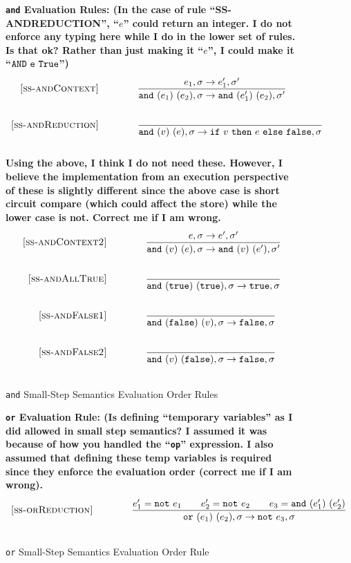 \documentclass{article}
\newcommand{\ife}[3]{\mbox{\tt if}~{#1}~\mbox{\tt then}~{#2}~\mbox{\tt else}~{#3}}
\newcommand{\note}[1]{\mbox{\tt not}~#1}
\newcommand{\ande}[2]{\mbox{\tt and}~(#1)~(#2)}
\newcommand{\ore}[2]{\mbox{\tt or}~(#1)~(#2)}
\newcommand{\true}{\mbox{\tt true}}
\newcommand{\false}{\mbox{\tt false}}
\begin{document}
\begin{figure}[H]\label{fig:andRules}
\caption{{\tt and} Small-Step Semantics Evaluation Order Rules}
{\bf {\tt and} Evaluation Rules: (In the case of rule ``SS-ANDREDUCTION'', ``$e$'' could return an integer.  I do not enforce any typing here while I do in the lower set of rules.  Is that ok?  Rather than just making it ``$e$'', I could make it ``${\tt AND~e~True}$'')}
\[
\\
\begin{array}{r@{\qquad\qquad}l}
\ssrule{ss-andContext}{
  \sstep{e_1}{\sigma}{e_1'}{\sigma'}
}{
  \sstep{\ande{e_1}{e_2}}{\sigma}{\ande{e_1'}{e_2}}{\sigma'}
}
\ssrule{ss-andReduction}{
}{
  \sstep{\ande{v}{e}}{\sigma}{\ife{v}{e}{\false}}{\sigma}
}
\end{array}
\]
{\bf Using the above, I think I do not need these.  However, I believe the implementation
from an execution perspective of these is slightly different since the above case is short circuit compare (which could affect the store) while the lower case is not.  Correct me if I am wrong.} 
\[
\\
\begin{array}{r@{\qquad\qquad}l}
\ssrule{ss-andContext2}{
  \sstep{e}{\sigma}{e'}{\sigma'}
}{
  \sstep{\ande{v}{e}}{\sigma}{\ande{v}{e'}}{\sigma'}
}
\ssrule{ss-andAllTrue}{
}{
  \sstep{\ande{\true}{\true}}{\sigma}{\true}{\sigma}
}
\ssrule{ss-andFalse1}{
}{
  \sstep{\ande{\false}{v}}{\sigma}{\false}{\sigma}
}
\ssrule{ss-andFalse2}{
}{
  \sstep{\ande{v}{\false}}{\sigma}{\false}{\sigma}
}
\end{array}
\]
\end{figure}

\begin{figure}[H]\label{fig:orRules}
\caption{{\tt or} Small-Step Semantics Evaluation Order Rule}
{\bf {\tt or} Evaluation Rule: (Is defining ``temporary variables'' as I did allowed in small step semantics?  I assumed it was because of how you handled the ``{\tt op}'' expression.  I also assumed that defining these temp variables is required since they enforce the evaluation order (correct me if I am wrong).} 
\[
\\
\begin{array}{r@{\qquad\qquad}l}
\ssrule{ss-orReduction}{
  e_1'=\note{e_1} \qquad e_2'=\note{e_2} \qquad e_3=\ande{e_1'}{e_2'}
}{
  \sstep{\ore{e_1}{e_2}}{\sigma}{\note{e_3}}{\sigma}
}
\end{array}
\]
\end{figure}
\end{document}
